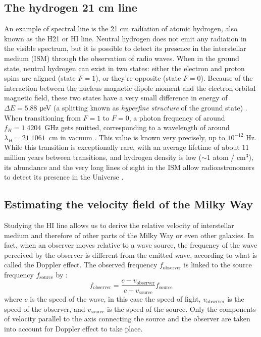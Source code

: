\subsection{The hydrogen 21 cm line}
An example of spectral line is the 21 cm radiation of atomic hydrogen, also known as the H21 or HI line.
Neutral hydrogen does not emit any radiation in the visible spectrum, but it is possible to detect its presence in the interstellar medium (ISM) through the observation of radio waves.
When in the ground state, neutral hydrogen can exist in two states: either the electron and proton spins are aligned (state $F=1$), or they're opposite (state $F=0$).
Because of the interaction between the nucleus magnetic dipole moment and the electron orbital magnetic field, these two states have a very small difference in energy of $\Delta E = 5.88$ \si{\micro\electronvolt} (a splitting known as \emph{hyperfine structure} of the ground state) \cite{lauterbach_radio_2022}.
When transitioning from $F=1$ to $F=0$, a photon frequency of around \mbox{$f_H = 1.4204$ GHz} gets emitted, corresponding to a wavelength of around \mbox{$\lambda_H = 21.1061$ cm} in vacuum \cite{hellwig_measurement_1970}. This value is known very precisely, up to $10^{-12}$ Hz.
While this transition is exceptionally rare, with an average lifetime of about $11$ million years between transitions, and hydrogen density is low ($\sim 1$ {atom /} cm$^{3}$), its abundance and the very long lines of sight in the ISM allow radioastronomers to detect its presence in the Universe \cite{burke_introduction_2013}.

\subsection{Estimating the velocity field of the Milky Way}
Studying the HI line allows us to derive the relative velocity of interstellar medium and therefore of other parts of the Milky Way or even other galaxies.
In fact, when an observer moves relative to a wave source, the frequency of the wave perceived by the observer is different from the emitted wave, according to what is called the Doppler effect.
The observed frequency $f_\textrm{observer}$ is linked to the source frequency $f_\textrm{source}$ by \cite{alonso_fundamental_1983}:
\begin{equation}
    f_\textrm{observer} = \frac{c - v_\textrm{observer}}{c + v_\textrm{source}} f_\textrm{source}
    \label{eq:doppler_general}
\end{equation}
where $c$ is the speed of the wave, in this case the speed of light, $v_\textrm{observer}$ is the speed of the observer, and $v_\textrm{source}$ is the speed of the source.
Only the components of velocity parallel to the axis connecting the source and the observer are taken into account {for Doppler effect to take place}.

